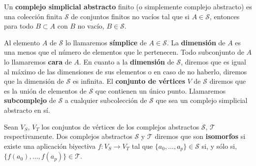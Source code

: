 \begin{definicion}
	Un \textbf{complejo simplicial abstracto} finito (o simplemente complejo abstracto)
	es una colección finita $\mathcal{S}$ de conjuntos finitos no vacíos tal que
	si $A \in \mathcal{S}$, entonces para todo $B \subset A$ con $B$ no vacío,
	$B \in \mathcal{S}$.
\end{definicion}

Al elemento $A$ de $\mathcal{S}$ lo llamaremos \textbf{símplice} de $A \in \mathcal{S}$.
La \textbf{dimensión} de $A$ es una menos que el número de elementos que le pertenecen.
Todo subconjunto de $A$ lo llamaremos \textbf{cara} de $A$. En cuanto a la
\textbf{dimensión} de $\mathcal{S}$, diremos que es igual al máximo de las
dimensiones de sus elementos o en caso de no haberlo, diremos que la dimensión de
$\mathcal{S}$ es infinita. El \textbf{conjunto de vértices} $V$ de $\mathcal{S}$
diremos que es la unión de elementos de $\mathcal{S}$ que contienen un único punto.
Llamaremos \textbf{subcomplejo} de $\mathcal{S}$ a cualquier subcolección de $\mathcal{S}$
que sea un complejo simplicial abstracto en sí.

Sean $V_{S}$, $V_{T}$ los conjuntos de vértices de los complejos abstractos
$\mathcal{S}$, $\mathcal{T}$ respectivamente. Dos complejos abstractos
$\mathcal{S}$ y $\mathcal{T}$ diremos que son \textbf{isomorfos} si existe una aplicación
biyectiva $f: V_{S} \rightarrow V_{T}$ tal que $\{a_{0}, \dots, a_{p}\} \in \mathcal{S}$
si, y sólo si, $\{f(a_{0}), \dots, f(a_{p})\} \in \mathcal{T}$.

